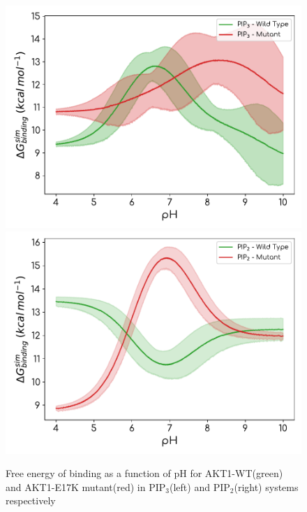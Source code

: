 \documentclass[12pt]{article}
\begin{document}
\begin{figure}[H] 
\begin{center}
\includegraphics[width=0.45\linewidth]{figs/pip3_mutant_wild_type_delg_ph.pdf}
\includegraphics[width=0.45\linewidth]{figs/pip2_mutant_wild_type_delg_ph.pdf}
\caption{Free energy of binding as a function of pH for AKT1-WT(green) and AKT1-E17K mutant(red) in PIP$_3$(left) and PIP$_2$(right) systems respectively}
\label{figure2}
\end{center}
\end{figure}

       


\end{document}
